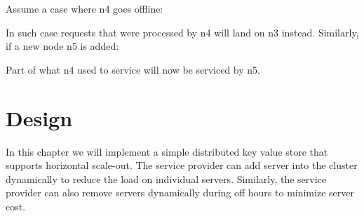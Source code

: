 Assume a case where n4 goes offline: 

\begin{center}
\end{center}

In such case requests that were processed by n4 will land on n3 instead.
Similarly, if a new node n5 is added:

\begin{center}
\end{center}

Part of what n4 used to service will now be serviced by n5.

\section{Design}

In this chapter we will implement a simple distributed key value store that
supports horizontal scale-out. The service provider can add server into the
cluster dynamically to reduce the load on individual servers. Similarly, the
service provider can also remove servers dynamically during off hours to
minimize server cost.\\

